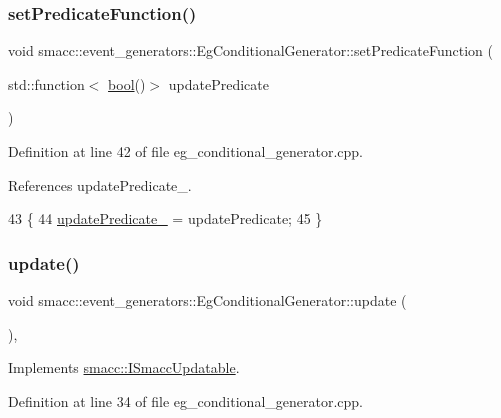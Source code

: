\subsubsection{\texorpdfstring{set\+Predicate\+Function()}{setPredicateFunction()}}
{\footnotesize\ttfamily void smacc\+::event\+\_\+generators\+::\+Eg\+Conditional\+Generator\+::set\+Predicate\+Function (\begin{DoxyParamCaption}\item[{std\+::function$<$ \hyperlink{classbool}{bool}()$>$}]{update\+Predicate }\end{DoxyParamCaption})}



Definition at line 42 of file eg\+\_\+conditional\+\_\+generator.\+cpp.



References update\+Predicate\+\_\+.


\begin{DoxyCode}
43         \{
44             \hyperlink{classsmacc_1_1event__generators_1_1EgConditionalGenerator_a4e4092ecfa7278deda39e8ade6455362}{updatePredicate\_} = updatePredicate;
45         \}
\end{DoxyCode}
\mbox{\label{classsmacc_1_1event__generators_1_1EgConditionalGenerator_ab5e500fd01fb21a7e6b836405431c6f2}} 
\subsubsection{\texorpdfstring{update()}{update()}}
{\footnotesize\ttfamily void smacc\+::event\+\_\+generators\+::\+Eg\+Conditional\+Generator\+::update (\begin{DoxyParamCaption}{ }\end{DoxyParamCaption})\hspace{0.3cm}{\ttfamily [override]}, {\ttfamily [virtual]}}



Implements \hyperlink{classsmacc_1_1ISmaccUpdatable_a84ee0520cbefdb1d412bed54650b028e}{smacc\+::\+I\+Smacc\+Updatable}.



Definition at line 34 of file eg\+\_\+conditional\+\_\+generator.\+cpp.



